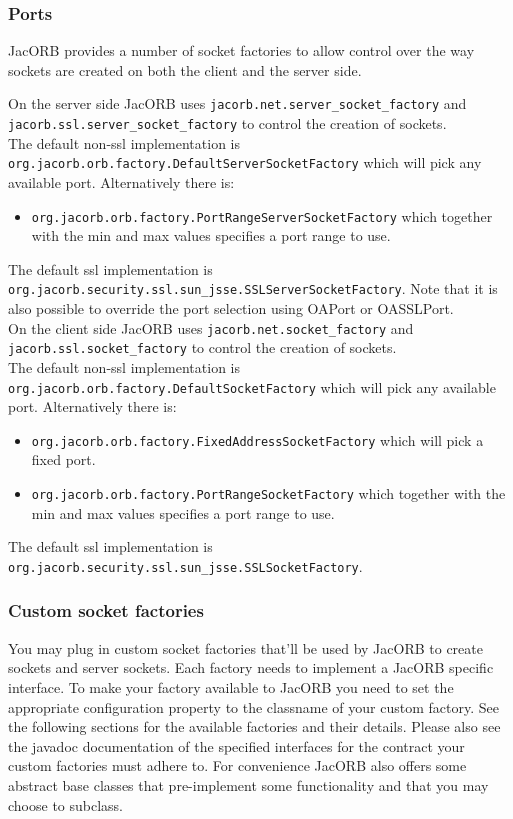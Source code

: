 \subsubsection{Ports}
JacORB provides a number of socket factories to allow control over the way
sockets are created on both the client and the server side.

On the server side JacORB uses {\tt jacorb.net.server\_socket\_factory} and
{\tt jacorb.ssl.server\_socket\_factory} to control the creation of sockets.\\
The default non-ssl implementation is {\tt org.jacorb.orb.factory.DefaultServerSocketFactory}
which will pick any available port. Alternatively there is:
\begin{itemize}
\item {\tt org.jacorb.orb.factory.PortRangeServerSocketFactory} which
together with the min and max values specifies a port range to use.
\end{itemize}
The default ssl implementation is
{\tt org.jacorb.security.ssl.sun\_jsse.SSLServerSocketFactory}.
Note that it is also possible to override the port selection using OAPort or OASSLPort.\\

On the client side JacORB uses {\tt jacorb.net.socket\_factory} and {\tt
jacorb.ssl.socket\_factory} to control the creation of sockets.\\
The default non-ssl implementation is
{\tt org.jacorb.orb.factory.DefaultSocketFactory} which will pick any available
port. Alternatively there is:
\begin{itemize}
\item {\tt org.jacorb.orb.factory.FixedAddressSocketFactory} which will pick a fixed port.
\item {\tt org.jacorb.orb.factory.PortRangeSocketFactory} which together with the min and max values specifies a port range to use.
\end{itemize}
The default ssl implementation is {\tt org.jacorb.security.ssl.sun\_jsse.SSLSocketFactory}.


\subsubsection{Custom socket factories}
\label{sec:customSocketFactories}

You may plug in custom socket factories that'll be used by JacORB to
create sockets and server sockets. Each factory needs to implement a JacORB specific
interface. To make your factory available to JacORB you need to set the appropriate
configuration property to the classname of your custom factory. See the following
sections for the available factories and their details. Please also see the javadoc documentation
of the specified interfaces for the contract your custom factories must adhere to.
For convenience JacORB also offers some abstract base classes that pre-implement some functionality and that you
may choose to subclass.

